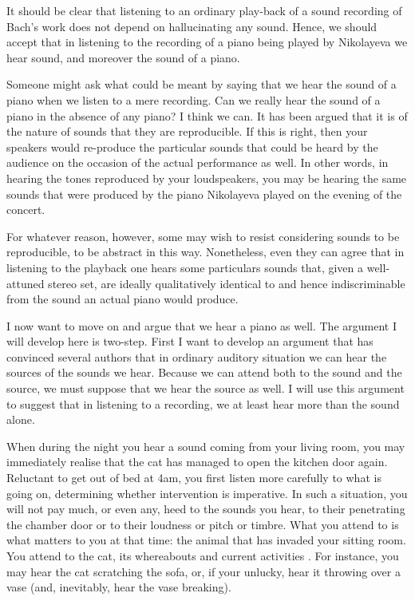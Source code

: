 \documentclass[sloppy, journal, git, bytitle, dodraft]{humapap}
\begin{document}
It should be clear that listening to an ordinary play-back of a sound recording of Bach's work does not depend on hallucinating any sound. Hence, we should accept that in listening to the recording of a piano being played by Nikolayeva we hear sound, and moreover the sound of a piano.

Someone might ask what could be meant by saying that we hear the sound of a piano when we listen to a mere recording. Can we really hear the sound of a piano in the absence of any piano? I think we can. It has been argued that it is of the nature of sounds that they are reproducible. If this is right, then your speakers would re-produce the particular sounds that could be heard by the audience on the occasion of the actual performance as well. In other words, in hearing the tones reproduced by your loudspeakers, you may be hearing the same sounds that were produced by the piano Nikolayeva played on the evening of the concert. 

For whatever reason, however, some may wish to resist considering sounds to be reproducible, to be abstract in this way. Nonetheless, even they can agree that in listening to the playback one hears some particulars sounds that, given a well-attuned stereo set, are ideally qualitatively identical to and hence indiscriminable from the sound an actual piano would produce.


\sect I now want to move on and argue that we hear a piano as well. The argument I will develop here is two-step. First I want to develop an argument that has convinced several authors that in ordinary auditory situation we can hear the sources of the sounds we hear. Because we can attend both to the sound and the source, we must suppose that we hear the source as well. I will use this argument to suggest that in listening to a recording, we at least hear more than the sound alone. 
	
When during the night you hear a sound coming from your living room, you may immediately realise that the cat has managed to open the kitchen door again. Reluctant to get out of bed at 4am, you first listen more carefully to what is going on, determining whether intervention is imperative. In such a situation, you will not pay much, or even any, heed to the sounds you hear, to their penetrating the chamber door or to their loudness or pitch or timbre. What you attend to is what matters to you at that time: the animal that has invaded your sitting room. You attend to the cat, its whereabouts and current activities \autocite[cf.][p. ?]{nudds2013}. For instance, you may hear the cat scratching the sofa, or, if your unlucky, hear it throwing over a vase (and, inevitably, hear the vase breaking).
\end{document}
